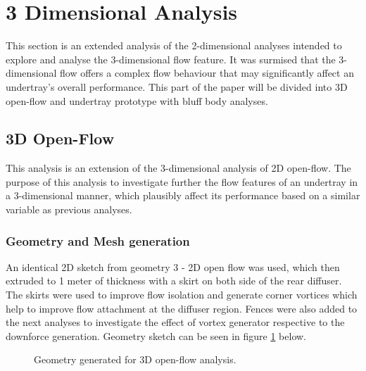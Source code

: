 \section{3 Dimensional Analysis}
\noindent This section is an extended analysis of the 2-dimensional analyses intended to explore and analyse the 3-dimensional flow feature. It was surmised that the 3-dimensional flow offers a complex flow behaviour that may significantly affect an undertray's overall performance. This part of the paper will be divided into 3D open-flow and undertray prototype with bluff body analyses.


\subsection{3D Open-Flow}
This analysis is an extension of the 3-dimensional analysis of 2D open-flow. The purpose of this analysis to investigate further the flow features of an undertray in a 3-dimensional manner, which plausibly affect its performance based on a similar variable as previous analyses.

\subsubsection{Geometry and Mesh generation}
An identical 2D sketch from geometry 3 - 2D open flow was used, which then extruded to 1 meter of thickness with a skirt on both side of the rear diffuser. The skirts were used to improve flow isolation and generate corner vortices which help to improve flow attachment at the diffuser region. Fences were also added to the next analyses to investigate the effect of vortex generator respective to the downforce generation. Geometry sketch can be seen in figure \ref{fig:3D_OF_GEOM} below. 

\begin{figure}[!h]
    \centering
    \noindent{}
    \caption{Geometry generated for 3D open-flow analysis.}
    \label{fig:3D_OF_GEOM}
\end{figure}

